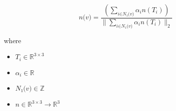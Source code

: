 \documentclass[12pt]{article}
\begin{document}
\[
\textit{n(v)} = \frac{(\sum_{\textit{i} \in \textit{N₁(v)} } \textit{α}_{ \textit{i} }\textit{n}(\textit{T}_{ \textit{i} }))}{\|\sum_{\textit{i} \in \textit{N₁(v)} } \textit{α}_{ \textit{i} }\textit{n}(\textit{T}_{ \textit{i} })\|_2}
\]

where
\begin{itemize}
\item $\textit{T}_{\textit{i}} \in \mathbb{R}^{ 3 \times 3 }$
\item $\textit{α}_{\textit{i}} \in \mathbb{{R}}$
\item $\textit{N₁(v)} \in \mathbb{Z}$
\item $\textit{n} \in \mathbb{R}^{ 3 \times 3 }\rightarrow \mathbb{R}^{ 3}$
\end{itemize}
\end{document}
